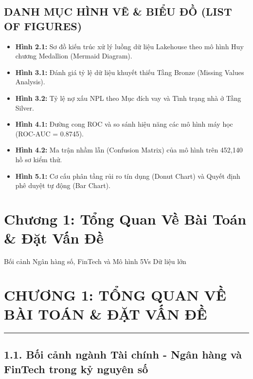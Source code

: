 \documentclass[
  13pt,
  a4paper,
]{report}
\providecommand{\tightlist}{%
  \setlength{\itemsep}{0pt}\setlength{\parskip}{0pt}}
\begin{document}
\section{DANH MỤC HÌNH VẼ \& BIỂU ĐỒ (LIST OF
FIGURES)}\label{danh-mux1ee5c-huxecnh-vux1ebd-biux1ec3u-ux111ux1ed3-list-of-figures}

\begin{itemize}
\tightlist
\item
  \textbf{Hình 2.1:} Sơ đồ kiến trúc xử lý luồng dữ liệu Lakehouse theo
  mô hình Huy chương Medallion (Mermaid Diagram).
\item
  \textbf{Hình 3.1:} Đánh giá tỷ lệ dữ liệu khuyết thiếu Tầng Bronze
  (Missing Values Analysis).
\item
  \textbf{Hình 3.2:} Tỷ lệ nợ xấu NPL theo Mục đích vay và Tình trạng
  nhà ở Tầng Silver.
\item
  \textbf{Hình 4.1:} Đường cong ROC và so sánh hiệu năng các mô hình máy
  học (ROC-AUC = 0.8745).
\item
  \textbf{Hình 4.2:} Ma trận nhầm lẫn (Confusion Matrix) của mô hình
  trên 452,140 hồ sơ kiểm thử.
\item
  \textbf{Hình 5.1:} Cơ cấu phân tầng rủi ro tín dụng (Donut Chart) và
  Quyết định phê duyệt tự động (Bar Chart).
\end{itemize}


\chapter{Chương 1: Tổng Quan Về Bài Toán \& Đặt Vấn
Đề}\label{chux1b0ux1a1ng-1-tux1ed5ng-quan-vux1ec1-buxe0i-touxe1n-ux111ux1eb7t-vux1ea5n-ux111ux1ec1}

Bối cảnh Ngân hàng số, FinTech và Mô hình 5Vs Dữ liệu lớn

\hfill\break


\chapter{CHƯƠNG 1: TỔNG QUAN VỀ BÀI TOÁN \& ĐẶT VẤN
ĐỀ}\label{chux1b0ux1a1ng-1-tux1ed5ng-quan-vux1ec1-buxe0i-touxe1n-ux111ux1eb7t-vux1ea5n-ux111ux1ec1-1}

\begin{center}\rule{0.5\linewidth}{0.5pt}\end{center}

\section{1.1. Bối cảnh ngành Tài chính - Ngân hàng và FinTech trong kỷ
nguyên
số}\label{bux1ed1i-cux1ea3nh-nguxe0nh-tuxe0i-chuxednh---nguxe2n-huxe0ng-vuxe0-fintech-trong-kux1ef7-nguyuxean-sux1ed1}
\end{document}
